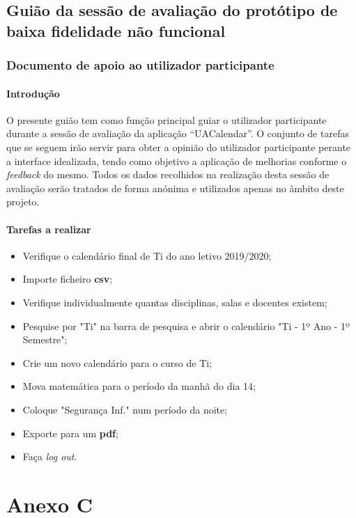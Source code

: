 \documentclass[11pt, twoside]{report}
\begin{document}
		\section*{Guião da sessão de avaliação do protótipo de baixa fidelidade não funcional}
		\subsection*{Documento de apoio ao utilizador participante}
			
		
		\subsubsection*{Introdução}
			O presente guião tem como função principal guiar o utilizador participante durante a sessão de avaliação da aplicação “UACalendar”. O conjunto de tarefas que se seguem irão servir para obter a opinião do utilizador participante perante a interface idealizada, tendo como objetivo a aplicação de melhorias conforme o \textit{feedback} do mesmo. Todos os dados recolhidos na realização desta sessão de avaliação serão tratados de forma anónima e utilizados apenas no âmbito deste projeto.
	
		\subsubsection*{Tarefas a realizar}	
	\begin{itemize}
		\item Verifique o calendário final de Ti do ano letivo 2019/2020;
		\item Importe ficheiro \textbf{csv};
		\item Verifique individualmente quantas disciplinas, salas e docentes existem;
		\item Pesquise por "Ti" na barra de pesquisa e abrir o calendário "Ti - 1º Ano - 1º Semestre";
		\item Crie um novo calendário para o curso de Ti;
		\item Mova matemática para o período da manhã do dia 14;
		\item Coloque "Segurança Inf." num período da noite;
		\item Exporte para um \textbf{pdf};
		\item Faça \textit{log out}.
	\end{itemize}

	
	\chapter*{Anexo C}
\end{document}

